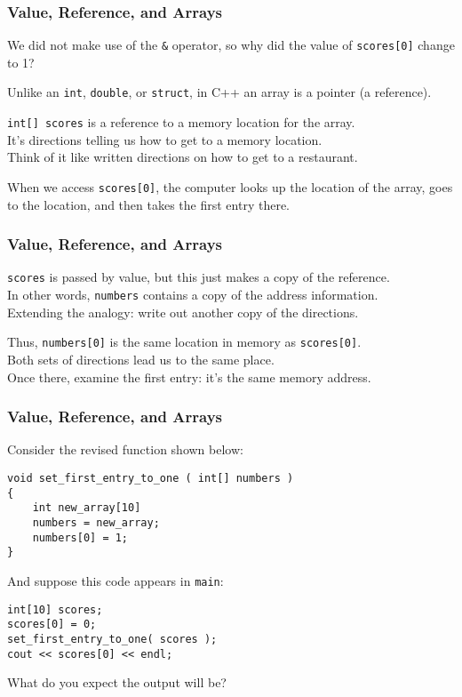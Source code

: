 \begin{frame}
\frametitle{Value, Reference, and Arrays}
We did not make use of the \texttt{\&} operator, so why did the value of \texttt{scores[0]} change to 1?

Unlike an \texttt{int}, \texttt{double}, or \texttt{struct}, in C++ an array is a \alert{pointer} (a reference).

\texttt{int[] scores} is a reference to a memory location for the array.\\
\quad It's directions telling us how to get to a memory location.\\
\quad Think of it like written directions on how to get to a restaurant.

When we access \texttt{scores[0]}, the computer looks up the location of the array, goes to the location, and then takes the first entry there.

\end{frame}

\begin{frame}
\frametitle{Value, Reference, and Arrays}
\texttt{scores} is passed by value, but this just makes a copy of the reference.\\
\quad In other words, \texttt{numbers} contains a copy of the address information.\\
\quad Extending the analogy: write out another copy of the directions.

Thus, \texttt{numbers[0]} is the same location in memory as \texttt{scores[0]}.\\
\quad Both sets of directions lead us to the same place.\\
\quad Once there, examine the first entry: it's the same memory address.

\end{frame}

\begin{frame}[fragile]
\frametitle{Value, Reference, and Arrays}

Consider the revised function shown below:

\begin{verbatim}
void set_first_entry_to_one ( int[] numbers )
{
    int new_array[10]
    numbers = new_array;
    numbers[0] = 1;
}
\end{verbatim}

And suppose this code appears in \texttt{main}:
\begin{verbatim}
int[10] scores;
scores[0] = 0;
set_first_entry_to_one( scores );
cout << scores[0] << endl;
\end{verbatim}

What do you expect the output will be?

\end{frame}

